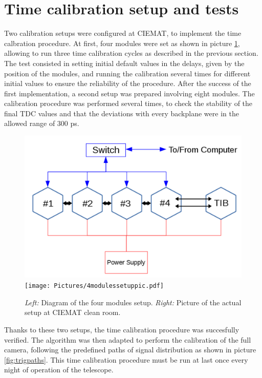 \documentclass[main.tex]{subfiles}
\begin{document}
\section{Time calibration setup and tests}

Two calibration setups were configured at CIEMAT, to implement the time calbration procedure. At first, four modules were set as shown in picture \ref{fig:timecalfig1}, allowing to run three time calibration cycles as described in the previous section. The test consisted in setting initial default values in the delays, given by the position of the modules, and running the calibration several times for different initial values to ensure the reliability of the procedure. After the success of the first implementation, a second setup was prepared involving eight modules. The calibration procedure was performed several times, to check the stability of the final TDC values and that the deviations with every backplane were in the allowed range of 300 ps.

\begin{figure}[!htb]
\includegraphics[width=\linewidth]{Pictures/4modulessetupdiagram.pdf}
\endminipage\hfill
{}
\texttt{[image: Pictures/4modulessetuppic.pdf]}
\endminipage\hfill
\caption{\label{fig:timecalfig1}\textit{Left:} Diagram of the four modules setup. \textit{Right:} Picture of the actual setup at CIEMAT clean room.}
\end{figure}

Thanks to these two setups, the time calibration procedure was succesfully verified. The algorithm was then adapted to perform the calibration of the full camera, following the predefined paths of signal distribution as shown in picture \ref{fig:trigpaths}. This time calibration procedure must be run at last once every night of operation of the telescope.
\end{document}
